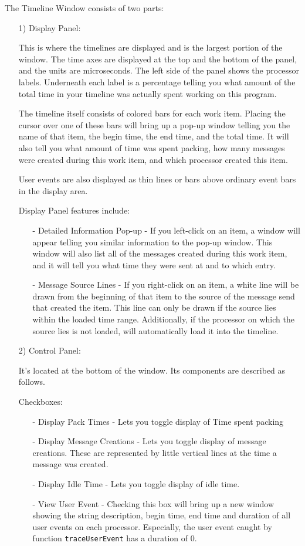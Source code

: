 \documentclass[10pt,dvips]{article}
\begin{document}
The Timeline Window consists of two parts:
\begin{enumerate}
\item[1)]
Display Panel:

This is where the timelines are displayed and is the largest portion
of the window.  The time axes are displayed at the top and the bottom
of the panel, and the units are microseconds.  The left side of the
panel shows the processor labels.  Underneath each label is a
percentage telling you what amount of the total time in your timeline
was actually spent working on this program.

The timeline itself consists of colored bars for each work item.
Placing the cursor over one of these bars will bring up a pop-up
window telling you the name of that item, the begin time, the end
time, and the total time.  It will also tell you what amount of time
was spent packing, how many messages were created during this work
item, and which processor created this item. 

User events are also displayed as thin lines or bars above ordinary
event bars in the display area.

Display Panel features include:
   \begin{itemize}
   \item[-] 
   Detailed Information Pop-up - If you left-click on an item, a
   window will appear telling you similar information to the pop-up
   window.  This window will also list all of the messages created
   during this work item, and it will tell you what time they were
   sent at and to which entry.
   \item[-]
   Message Source Lines - If you right-click on an item, a white line
   will be drawn from the beginning of that item to the source of the
   message send that created the item. This line can only be drawn if
   the source lies within the loaded time range. Additionally, if the
   processor on which the source lies is not loaded, \projections{}
   will automatically load it into the timeline.
   \end{itemize}

\item[2)]
Control Panel:

It's located at the bottom of the window. Its components are described
as follows.

Checkboxes:
   \begin{itemize}
   \item[-]
   Display Pack Times - Lets you toggle display of Time spent packing
   \item[-] 
   Display Message Creations - Lets you toggle display of message
   creations. These are represented by little vertical lines at the
   time a message was created.
   \item[-]
   Display Idle Time - Lets you toggle display of idle time.
   \item[-]
   View User Event - Checking this box will bring up a new window
   showing the string description, begin time, end time and duration
   of all user events on each processor.  Especially, the user event
   caught by function {\tt traceUserEvent} has a duration of 0.


\end{itemize}
\end{enumerate}
\end{document}
